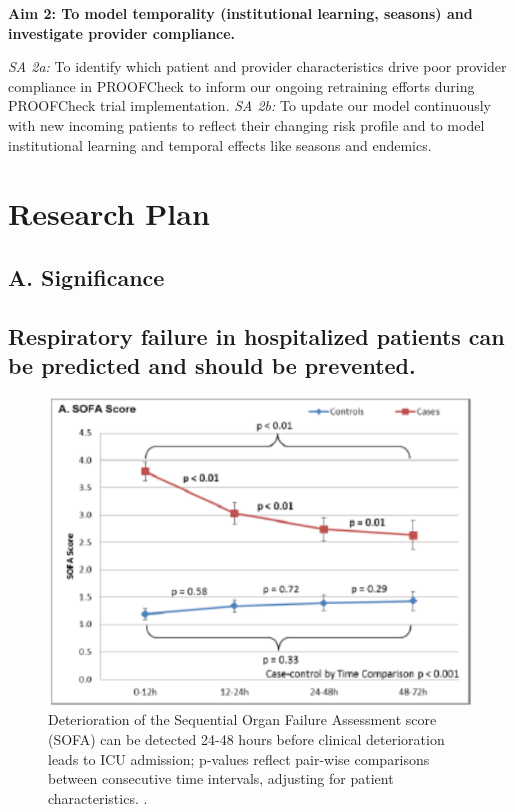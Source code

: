 \documentclass[11pt,notitlepage]{article}
\begin{document}
\begin{flushleft}
\textbf{Aim 2: To model temporality (institutional learning, seasons) and investigate provider compliance.}
\end{flushleft}
\vspace{-5pt}
\textit{SA 2a:} To identify which patient and provider characteristics drive poor provider compliance in PROOFCheck to inform our ongoing retraining efforts during PROOFCheck trial implementation. \newline
\textit{SA 2b:} To update our model continuously with new incoming patients to reflect their changing risk profile and to model institutional learning and temporal effects like seasons and endemics. 
\section*{Research Plan}

\subsection*{A. Significance}

\subsection*{Respiratory failure in hospitalized patients can be predicted and should be prevented.} 

\begin{figure}
 \vspace{-10pt}
 \includegraphics[scale=0.7]{Figures/SOFA_fig.png}
  \vspace{-25pt}
  \caption{\footnotesize Deterioration of the Sequential Organ Failure Assessment score (SOFA) can be detected 24-48 hours before clinical deterioration leads to ICU admission; p-values reflect pair-wise comparisons between consecutive time intervals, adjusting for patient characteristics. \cite{Yu_24970344}.}
    \label{fig:SOFA_fig}
 \vspace{-15pt}
\end{figure}
\end{document}
